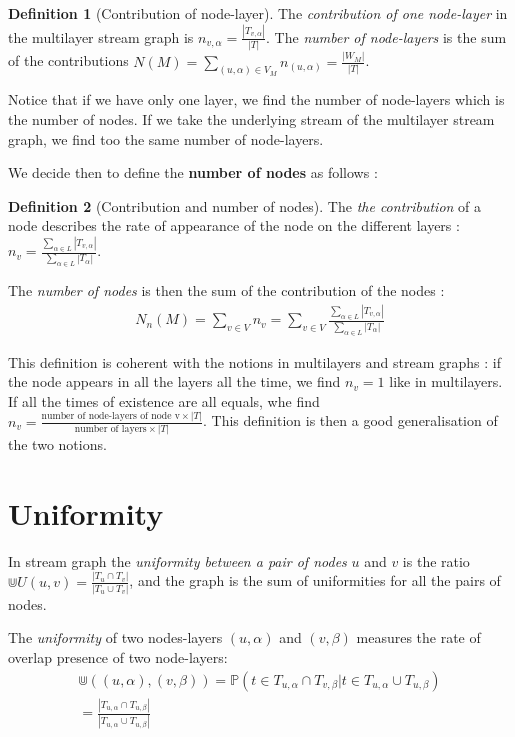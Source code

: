 \documentclass[dvipsnames,a4paper,11pt]{article}
\theoremstyle{definition}
\newtheorem{defn}{Definition}
\theoremstyle{remark}
\theoremstyle{remark}
\begin{document}
	\begin{defn}[Contribution of node-layer]
	The {\em contribution of one node-layer} in the multilayer stream graph is $n_{v,\alpha} = \frac{|T_{v,\alpha}|}{|T|}$. The {\em number of node-layers} is the sum of the contributions $N(M) = \underset{(u,\alpha)\in V_M}{\sum} n_{(u,\alpha)} = \frac{|W_M|}{|T|}$.
    \end{defn}
	
	Notice that if we have only one layer, we find the number of node-layers which is the number of nodes. If we take the underlying stream of the multilayer stream graph, we find too the same number of node-layers.

    
    We decide then to define the \textbf{number of nodes} as follows : 
    
    \begin{defn}[Contribution and number of nodes]
    The {\em the contribution} of a node describes the rate of appearance of the node on the different layers : $n_v = \frac{\sum_{\alpha \in L}|T_{v,\alpha}|}{\sum_{\alpha \in L} |T_{\alpha}|}$.
    
    The {\em number of nodes} is then the sum of the contribution of the nodes : 
    \begin{align}
    N_n(M) = \sum_{v\in V} n_v= \sum_{v\in V} \frac{\sum_{\alpha \in L}|T_{v,\alpha}|}{\sum_{\alpha \in L} |T_{\alpha}|} 
    \label{numberNodes}
	\end{align}     
	
	\end{defn}
	
	This definition is coherent with the notions in multilayers and stream graphs : if the node appears in all the layers all the time, we find $n_v = 1$ like in multilayers. If all the times of existence are all equals, whe find $n_v=\frac{\text{number of node-layers of node v}\times |T|}{\text{number of layers}\times |T|}$. This definition is then a good generalisation of the two notions.
	
	\section{Uniformity}
	
	In stream graph the {\em uniformity between a pair of nodes} $u$ and $v$ is the ratio $\Cup U(u,v) = \frac{|T_u\cap T_v|}{|T_u \cup T_v|}$, and the graph is the sum of uniformities for all the pairs of nodes.
	
	The {\em uniformity } of two nodes-layers $(u,\alpha)$ and $(v,\beta)$ measures the rate of overlap presence of two node-layers:
	\begin{align*}
		\Cup((u,\alpha),(v,\beta))=\mathbb{P}( t \in T_{u,\alpha} \cap T_{v,\beta} | t \in T_{u,\alpha} \cup T_{u,\beta}) \\
		= \frac{|T_{u,\alpha}\cap T_{u,\beta}|}{|T_{u,\alpha}\cup T_{u,\beta}|}
	\end{align*}
\end{document}
